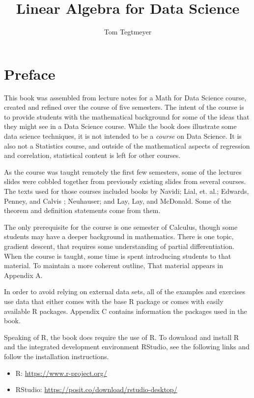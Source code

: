 \documentclass[
]{book}
\title{Linear Algebra for Data Science}
\author{Tom Tegtmeyer}
\date{}
\newcommand{\eps}{\varepsilon}
\theoremstyle{definition}
\theoremstyle{definition}
\theoremstyle{definition}
\theoremstyle{definition}
\theoremstyle{remark}
\begin{document}
\maketitle

\renewcommand{\eps}{\varepsilon}

\chapter*{Preface}\label{preface}

This book was assembled from lecture notes for a Math for Data Science course, created and refined over the course of five semesters. The intent of the course is to provide students with the mathematical background for some of the ideas that they might see in a Data Science course. While the book does illustrate some data science techniques, it is not intended to be a \emph{course} on Data Science. It is also not a Statistics course, and outside of the mathematical aspects of regression and correlation, statistical content is left for other courses.

As the course was taught remotely the first few semesters, some of the lectures slides were cobbled together from previously existing slides from several courses. The texts used for those courses included books by Navidi\autocite{Navidi}; Lial, et. al.\autocite{Lial}; Edwards, Penney, and Calvis \autocite{EP}; Neuhauser\autocite{Neuhauser}; and Lay, Lay, and McDonald\autocite{LLM}. Some of the theorem and definition statements come from them.

The only prerequisite for the course is one semester of Calculus, though some students may have a deeper background in mathematics. There is one topic, gradient descent, that requires some understanding of partial differentiation. When the course is taught, some time is spent introducing students to that material. To maintain a more coherent outline, That material appears in Appendix A.

In order to avoid relying on external data sets, all of the examples and exercises use data that either comes with the base R package or comes with easily available R packages. Appendix C contains information the packages used in the book.

Speaking of R, the book does require the use of R. To download and install R and the integrated development environment RStudio, see the following links and follow the installation instructions.

\begin{itemize}
\item
  R: \url{https://www.r-project.org/}
\item
  RStudio: \url{https://posit.co/download/rstudio-desktop/}
\end{itemize}
\end{document}
